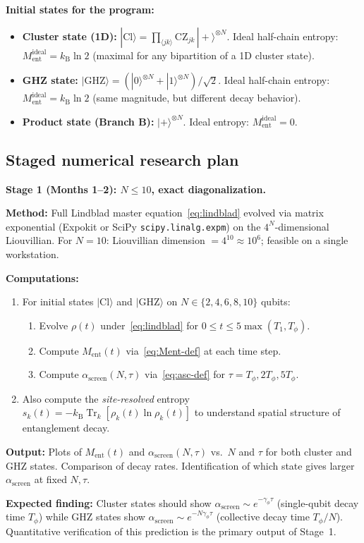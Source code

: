 \documentclass[12pt,letterpaper]{article}
\theoremstyle{plain}
\theoremstyle{definition}
\theoremstyle{remark}
\newcommand{\kB}{k_{\mathrm{B}}}
\newcommand{\asc}{\alpha_{\mathrm{screen}}}
\newcommand{\tr}{\operatorname{Tr}}
\begin{document}
\textbf{Initial states for the program:}

\begin{itemize}
\item \textbf{Cluster state (1D):} $|\mathrm{Cl}\rangle = \prod_{\langle jk\rangle} \mathrm{CZ}_{jk}\,|+\rangle^{\otimes N}$.
  Ideal half-chain entropy: $M_{\mathrm{ent}}^{\mathrm{ideal}} = \kB\ln 2$ (maximal for any bipartition of a 1D cluster state).
\item \textbf{GHZ state:} $|\mathrm{GHZ}\rangle = (|0\rangle^{\otimes N} + |1\rangle^{\otimes N})/\sqrt{2}$.
  Ideal half-chain entropy: $M_{\mathrm{ent}}^{\mathrm{ideal}} = \kB\ln 2$ (same magnitude, but different decay behavior).
\item \textbf{Product state (Branch B):} $|+\rangle^{\otimes N}$.
  Ideal entropy: $M_{\mathrm{ent}}^{\mathrm{ideal}} = 0$.
\end{itemize}

\subsection{Staged numerical research plan}

\begin{opbox}
\textbf{Stage 1 (Months 1--2): $N \leq 10$, exact diagonalization.}

\textbf{Method:} Full Lindblad master equation~\eqref{eq:lindblad} evolved via matrix exponential (Expokit or SciPy \texttt{scipy.linalg.expm}) on the $4^N$-dimensional Liouvillian. For $N = 10$: Liouvillian dimension $= 4^{10} \approx 10^6$; feasible on a single workstation.

\textbf{Computations:}
\begin{enumerate}
\item For initial states $|\mathrm{Cl}\rangle$ and $|\mathrm{GHZ}\rangle$ on $N \in \{2, 4, 6, 8, 10\}$ qubits:
  \begin{enumerate}[label=(\alph*)]
  \item Evolve $\rho(t)$ under~\eqref{eq:lindblad} for $0 \leq t \leq 5\max(T_1, T_\phi)$.
  \item Compute $M_{\mathrm{ent}}(t)$ via~\eqref{eq:Ment-def} at each time step.
  \item Compute $\asc(N,\tau)$ via~\eqref{eq:asc-def} for $\tau = T_\phi, 2T_\phi, 5T_\phi$.
  \end{enumerate}
\item Also compute the \emph{site-resolved} entropy $s_k(t) = -\kB\tr_k[\rho_k(t)\ln\rho_k(t)]$
  to understand spatial structure of entanglement decay.
\end{enumerate}

\textbf{Output:} Plots of $M_{\mathrm{ent}}(t)$ and $\asc(N,\tau)$ vs.\ $N$ and $\tau$ for both cluster and GHZ states. Comparison of decay rates. Identification of which state gives larger $\asc$ at fixed $N, \tau$.

\textbf{Expected finding:} Cluster states should show $\asc \sim e^{-\gamma_\phi\tau}$ (single-qubit decay time $T_\phi$) while GHZ states show $\asc \sim e^{-N\gamma_\phi\tau}$ (collective decay time $T_\phi/N$). Quantitative verification of this prediction is the primary output of Stage~1.
\end{opbox}
\end{document}
